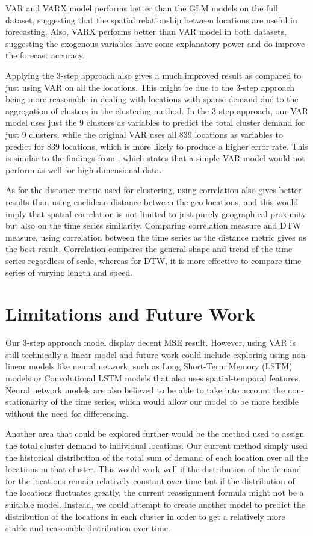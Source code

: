 \documentclass[12pt, letterpaper] {article}
\begin{document}
\noindent VAR and VARX model performs better than the GLM models on the full dataset, suggesting that the spatial relationship between locations are useful in forecasting. Also, VARX performs better than VAR model in both datasets, suggesting the exogenous variables have some explanatory power and do improve the forecast accuracy. 

\noindent Applying the 3-step approach also gives a much improved result as compared to just using VAR on all the locations. This might be due to the 3-step approach being more reasonable in dealing with locations with sparse demand due to the aggregation of clusters in the clustering method. In the 3-step approach, our VAR model uses just the 9 clusters as variables to predict the total cluster demand for just 9 clusters, while the original VAR uses all 839 locations as variables to predict for 839 locations, which is more likely to produce a higher error rate. This is similar to the findings from \cite{Abolfazl2017}, which states that a simple VAR model would not perform as well for high-dimensional data. 

\noindent As for the distance metric used for clustering, using correlation also gives better results than using euclidean distance between the geo-locations, and this would imply that spatial correlation is not limited to just purely geographical proximity but also on the time series similarity. Comparing correlation measure and DTW measure, using correlation between the time series as the distance metric gives us the best result. Correlation compares the general shape and trend of the time series regardless of scale, whereas for DTW, it is more effective to compare time series of varying length and speed. 

\section{Limitations and Future Work}
Our 3-step approach model display decent MSE result. However, using VAR is still technically a linear model and future work could include exploring using non-linear models like neural network, such as Long Short-Term Memory (LSTM) models or Convolutional LSTM models that also uses spatial-temporal features. Neural network models are also believed to be able to take into account the non-stationarity of the time series, which would allow our model to be more flexible without the need for differencing. 

\noindent Another area that could be explored further would be the method used to assign the total cluster demand to individual locations. Our current method simply used the historical distribution of the total sum of demand of each location over all the locations in that cluster. This would work well if the distribution of the demand for the locations remain relatively constant over time but if the distribution of the locations fluctuates greatly, the current reassignment formula might not be a suitable model. Instead, we could attempt to create another model to predict the distribution of the locations in each cluster in order to get a relatively more stable and reasonable distribution over time.
\end{document}

